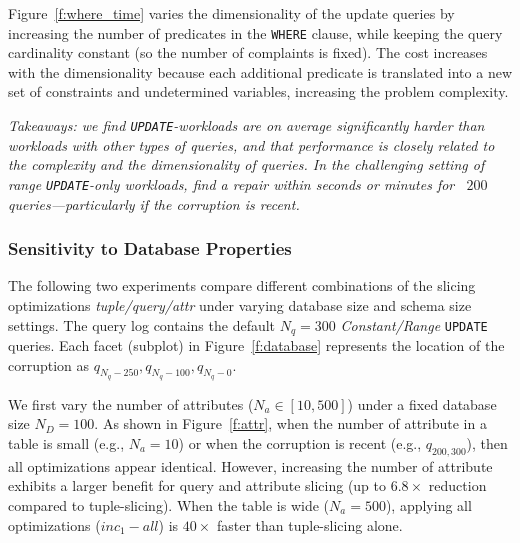 \smallskip
{}
Figure~\ref{f:where_time} varies the dimensionality of the update queries by increasing the number of predicates in the \texttt{WHERE} clause, while keeping the query cardinality constant (so the number of complaints is fixed).
The cost increases with the dimensionality because each additional predicate is translated into a new set of constraints and undetermined variables, increasing the problem complexity.

\smallskip
\textit{
  Takeaways: we find \texttt{UPDATE}-workloads are on average significantly harder than workloads with other types of queries, and that
  performance is closely related to the complexity and the dimensionality of queries. 
  In the challenging setting of range \texttt{UPDATE}-only workloads, \sys find a repair within seconds or minutes for ~$200$ queries---particularly if the corruption is recent. 
}




\subsubsection{Sensitivity to Database Properties}
\label{sec:experiments:dbproperties}

The following two experiments compare different combinations of the slicing optimizations \emph{tuple/query/attr} under varying database size and schema size settings.  
The query log contains the default $N_q = 300$ {\it Constant/Range} \texttt{UPDATE} queries.
Each facet (subplot) in Figure~\ref{f:database} represents the location of the corruption as $q_{N_q-250}, q_{N_q-100}, q_{N_q-0}$.

 
We first vary the number of attributes ($N_a \in [10, 500]$) under a fixed database size $N_D = 100$.
As shown in Figure~\ref{f:attr}, when the number of attribute in a table is small (e.g., $N_a=10$) or when the corruption is recent (e.g., $q_{200, 300}$), then all optimizations appear identical. 
However, increasing the number of attribute exhibits a larger benefit for query and attribute slicing (up to $6.8\times$ reduction compared to tuple-slicing).
When the table is wide ($N_a = 500$), applying all optimizations ($inc_1-all$) is $40\times$ faster than tuple-slicing alone.  


